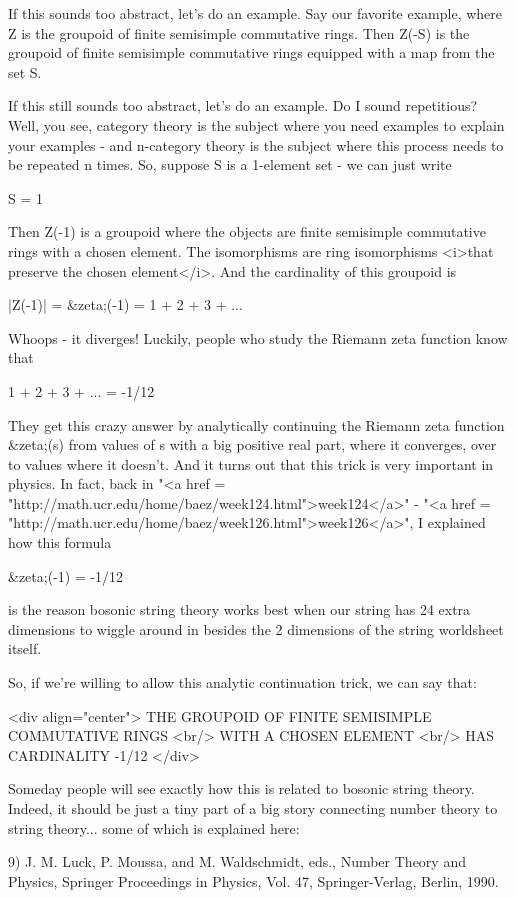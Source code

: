 If this sounds too abstract, let's do an example.  Say our favorite example, where Z is the groupoid of finite semisimple commutative rings.  Then Z(-S) is the groupoid of finite semisimple commutative rings equipped with a map from the set S.

If this still sounds too abstract, let's do an example.  Do I sound
repetitious?  Well, you see, category theory is the subject where you
need examples to explain your examples - and n-category theory is the
subject where this process needs to be repeated n times.  So,
suppose S is a 1-element set - we can just write

S = 1

Then Z(-1) is a groupoid where the objects are finite semisimple
commutative rings with a chosen element.  The isomorphisms are ring
isomorphisms <i>that preserve the chosen element</i>.  And the
cardinality of this groupoid is

|Z(-1)| = &zeta;(-1)  = 1 + 2 + 3 + ...

Whoops - it diverges!  Luckily, people who study the Riemann zeta
function know that

1 + 2 + 3 + ... = -1/12

They get this crazy answer by analytically continuing the Riemann zeta
function &zeta;(s) from values of s with a big positive real part,
where it converges, over to values where it doesn't.  And it turns out
that this trick is very important in physics.  In fact, back in
"<a href =
"http://math.ucr.edu/home/baez/week124.html">week124</a>" - "<a
href = "http://math.ucr.edu/home/baez/week126.html">week126</a>", I
explained how this formula

&zeta;(-1) = -1/12

is the reason bosonic string theory works best when our string has 24
extra dimensions to wiggle around in besides the 2 dimensions of the
string worldsheet itself.

So, if we're willing to allow this analytic continuation trick, we can
say that:

<div align="center">
THE GROUPOID OF FINITE SEMISIMPLE COMMUTATIVE RINGS <br/>
WITH A CHOSEN ELEMENT <br/>
HAS CARDINALITY -1/12 
</div>

Someday people will see exactly how this is related to bosonic string
theory.  Indeed, it should be just a tiny part of a big story
connecting number theory to string theory... some of which is
explained here:

9) J. M. Luck, P. Moussa, and M. Waldschmidt, eds., Number Theory and Physics, Springer Proceedings in Physics, Vol. 47, Springer-Verlag, Berlin, 1990.

